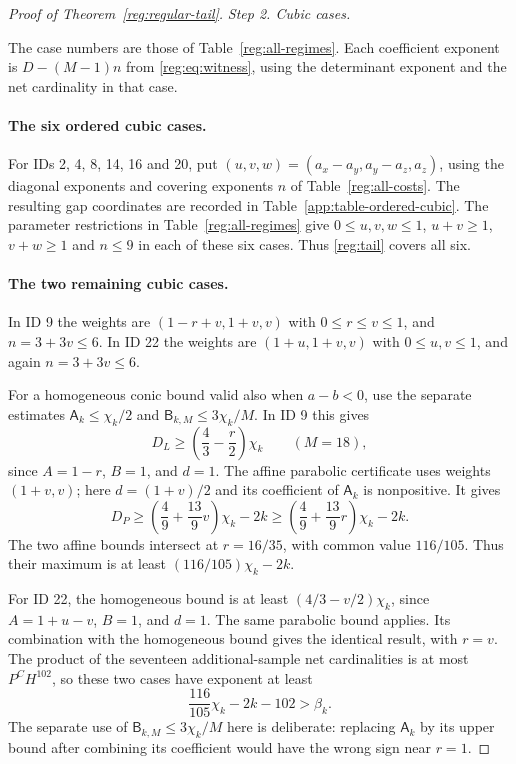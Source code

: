 \documentclass[11pt]{amsart}
\theoremstyle{definition}
\theoremstyle{remark}
\numberwithin{equation}{section}
\begin{document}
\begin{proof}[Proof of Theorem~\ref{reg:regular-tail}]
\par\medskip\noindent\textit{Step 2. Cubic cases.}\par\nobreak\smallskip
The case numbers are those of Table~\ref{reg:all-regimes}. Each coefficient exponent is $D-(M-1)n$ from \eqref{reg:eq:witness}, using the determinant exponent and the net cardinality in that case.

\paragraph{The six ordered cubic cases.}
For IDs 2, 4, 8, 14, 16 and 20, put $(u,v,w)=(a_x-a_y,a_y-a_z,a_z)$, using the diagonal exponents and covering exponents $n$ of Table~\ref{reg:all-costs}. The resulting gap coordinates are recorded in Table~\ref{app:table-ordered-cubic}. The parameter restrictions in Table~\ref{reg:all-regimes} give $0\le u,v,w\le1$, $u+v\ge1$, $v+w\ge1$ and $n\le9$ in each of these six cases. Thus \eqref{reg:tail} covers all six.

\paragraph{The two remaining cubic cases.}
In ID 9 the weights are $(1-r+v,1+v,v)$ with $0\le r\le v\le1$, and $n=3+3v\le6$. In ID 22 the weights are $(1+u,1+v,v)$ with $0\le u,v\le1$, and again $n=3+3v\le6$.

For a homogeneous conic bound valid also when $a-b<0$, use the separate estimates $\mathsf A_k\le\chi_k/2$ and $\mathsf B_{k,M}\le3\chi_k/M$. In ID 9 this gives
\[
D_L\ge\left(\frac43-\frac r2\right)\chi_k\qquad(M=18),
\]
since $A=1-r$, $B=1$, and $d=1$. The affine parabolic certificate uses weights $(1+v,v)$; here $d=(1+v)/2$ and its coefficient of $\mathsf A_k$ is nonpositive. It gives
\[
D_P\ge\left(\frac49+\frac{13}{9}v\right)\chi_k-2k
 \ge\left(\frac49+\frac{13}{9}r\right)\chi_k-2k.
\]
The two affine bounds intersect at $r=16/35$, with common value $116/105$. Thus their maximum is at least $(116/105)\chi_k-2k$.

For ID 22, the homogeneous bound is at least $(4/3-v/2)\chi_k$, since $A=1+u-v$, $B=1$, and $d=1$. The same parabolic bound applies. Its combination with the homogeneous bound gives the identical result, with $r=v$. The product of the seventeen additional-sample net cardinalities is at most $P^CH^{102}$, so these two cases have exponent at least
\begin{equation}\label{reg:eq:otherQ}
 \frac{116}{105}\chi_k-2k-102>\beta_k.
\end{equation}
The separate use of $\mathsf B_{k,M}\le3\chi_k/M$ here is deliberate: replacing $\mathsf A_k$ by its upper bound after combining its coefficient would have the wrong sign near $r=1$.


\end{proof}
\end{document}
